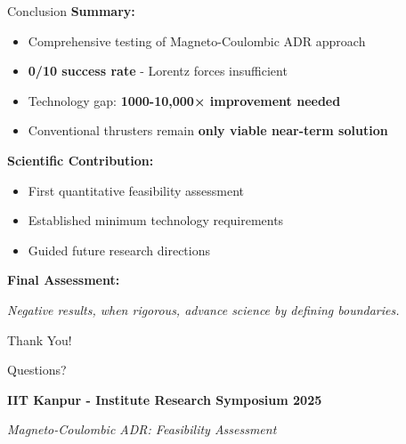 \documentclass[aspectratio=169]{beamer}
\begin{document}
\begin{frame}{Conclusion}
\textbf{Summary:}
\begin{itemize}
    \item Comprehensive testing of Magneto-Coulombic ADR approach
    \item \textbf{0/10 success rate} - Lorentz forces insufficient
    \item Technology gap: \textbf{1000-10,000× improvement needed}
    \item Conventional thrusters remain \textbf{only viable near-term solution}
\end{itemize}

\vspace{0.5cm}
\textbf{Scientific Contribution:}
\begin{itemize}
    \item First quantitative feasibility assessment
    \item Established minimum technology requirements
    \item Guided future research directions
\end{itemize}

\vspace{0.5cm}
\textbf{Final Assessment:}
\begin{center}
\end{center}

\vspace{0.3cm}
\begin{center}
\textit{Negative results, when rigorous, advance science by defining boundaries.}
\end{center}
\end{frame}

\begin{frame}{}
\begin{center}
{\Huge Thank You!}

\vspace{1cm}
{\Large Questions?}

\vspace{1.5cm}
\textbf{IIT Kanpur - Institute Research Symposium 2025}

\vspace{0.5cm}
\textit{Magneto-Coulombic ADR: Feasibility Assessment}
\end{center}
\end{frame}
\end{document}
